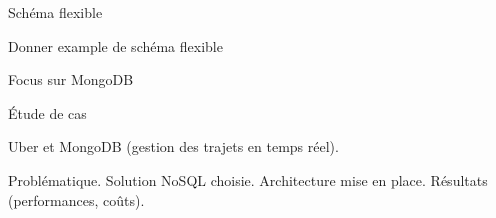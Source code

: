 \begin{frame}{Schéma flexible}

    Donner example de schéma flexible

\end{frame}


\begin{frame}{Focus sur MongoDB}

\end{frame}

\begin{frame}{Étude de cas}

    Uber et MongoDB (gestion des trajets en temps réel).

    Problématique.
    Solution NoSQL choisie.
    Architecture mise en place.
    Résultats (performances, coûts).

\end{frame}
